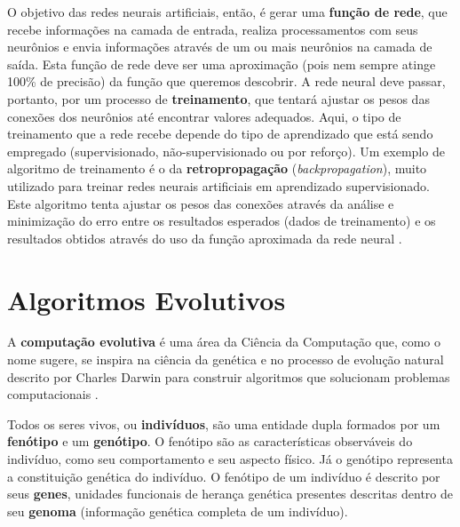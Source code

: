 O objetivo das redes neurais artificiais, então, é gerar uma \textbf{função de
rede}, que recebe informações na camada de entrada, realiza processamentos com
seus neurônios e envia informações através de um ou mais neurônios na camada de
saída. Esta função de rede deve ser uma aproximação (pois nem sempre atinge
100\% de precisão) da função que queremos descobrir. A rede neural deve passar,
portanto, por um processo de \textbf{treinamento}, que tentará ajustar os pesos
das conexões dos neurônios até encontrar valores adequados. Aqui, o tipo de
treinamento que a rede recebe depende do tipo de aprendizado que está sendo
empregado (supervisionado, não-supervisionado ou por reforço). Um exemplo de
algoritmo de treinamento é o da \textbf{retropropagação}
(\textit{backpropagation}), muito utilizado para treinar redes neurais
artificiais em aprendizado supervisionado. Este algoritmo tenta ajustar os pesos
das conexões através da análise e minimização do erro entre os resultados
esperados (dados de treinamento) e os resultados obtidos através do uso da
função aproximada da rede neural \cite[Cap. 7]{Rojas:1996:NNS:235222}.


\section{\label{section:evolutionary-algorithms}Algoritmos Evolutivos}
A \textbf{computação evolutiva} é uma área da Ciência da Computação que, como o
nome sugere, se inspira na ciência da genética e no processo de evolução natural
descrito por Charles Darwin para construir algoritmos que solucionam problemas
computacionais \cite[Cap. 2]{IntroEvolComputing}. 

Todos os seres vivos, ou \textbf{indivíduos}, são uma entidade dupla formados
por um \textbf{fenótipo} e um \textbf{genótipo}. O fenótipo são as
características observáveis do indivíduo, como seu comportamento e seu aspecto
físico. Já o genótipo representa a constituição genética do indivíduo. O
fenótipo de um indivíduo é descrito por seus \textbf{genes}, unidades funcionais
de herança genética presentes descritas dentro de seu \textbf{genoma}
(informação genética completa de um indivíduo).

